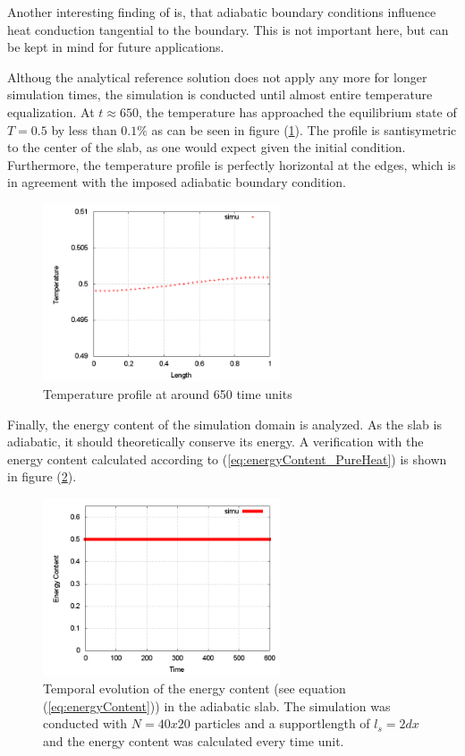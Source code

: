 \documentclass{report}
\begin{document}
Another interesting finding of \cite{Cleary1999} is, that adiabatic boundary conditions influence heat conduction tangential to the boundary. This is not important here, but can be kept in mind for future applications.

Althoug the analytical reference solution does not apply any more for longer simulation times, the simulation is conducted until almost entire temperature equalization. At $t\approx 650$, the temperature has approached the equilibrium state of $T=0.5$ by less than $0.1\%$ as can be seen in figure (\ref{fig:PureHeat_TProfile_t650}). The profile is santisymetric to the center of the slab, as one would expect given the initial condition. Furthermore, the temperature profile is perfectly horizontal at the edges, which is in agreement with the imposed adiabatic boundary condition.

\begin{figure}[h]  
  \label{fig:PureHeat_TProfile_t650}
  \centering
  \includegraphics[width=7cm]{Graphics/results/PureHeatConduction/T_profile000650062499}
  \caption{Temperature profile at around 650 time units}
\end{figure}

Finally, the energy content of the simulation domain is analyzed. As the slab is adiabatic, it should theoretically conserve its energy. A verification with the energy content calculated according to (\ref{eq:energyContent_PureHeat}) is shown in figure (\ref{fig:PureHeat_EnergyEvolution}).

\begin{figure}[h]  
  \label{fig:PureHeat_EnergyEvolution}
  \centering
  \includegraphics[width=7cm]{Graphics/results/PureHeatConduction/EnergyContentEvolution}
  \caption[Energy content of adiabatic slab]{Temporal evolution of the energy content (see equation (\ref{eq:energyContent})) in the adiabatic slab. The simulation was conducted with $N=40x20$ particles and a supportlength of $l_s=2dx$ and the energy content was calculated every time unit.}
\end{figure}
\end{document}
